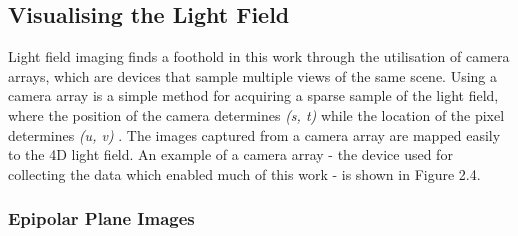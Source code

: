 \subsection{Visualising the Light Field}

Light field imaging finds a foothold in this work through the utilisation of camera arrays, which are devices that sample multiple views of the same scene. Using a camera array is a simple method for acquiring a sparse sample of the light field, where the position of the camera determines \textit{(s, t)} while the location of the pixel determines \textit{(u, v)} \cite{yao2016camarray}. The images captured from a camera array are mapped easily to the 4D light field. An example of a camera array - the device used for collecting the data which enabled much of this work - is shown in Figure 2.4. 


\subsubsection{Epipolar Plane Images}

